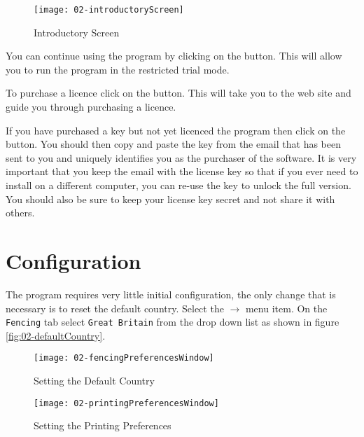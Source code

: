 \documentclass[a4paper,11pt]{memoir}
\begin{document}
\begin{figure}[!ht]
 \centering
 \texttt{[image: 02-introductoryScreen]}
 \caption{Introductory Screen}\label{fig:02-introductoryScreen}
\end{figure}

You can continue using the program by clicking on the  button. This will allow you to run the program in the restricted trial mode.

To purchase a licence click on the  button. This will take you to the \fencingtime{} web site and guide you through purchasing a licence.

If you have purchased a key but not yet licenced the program then click on the  button. You should then copy and paste the key from the email that has been sent to you and uniquely identifies you as the purchaser of the software. It is very important that you keep the email with the license key so that if you ever need to install \fencingtime{} on a different computer, you can re-use the key to unlock the full version. You should also be sure to keep your license key secret and not share it with others.

\section{Configuration}
The program requires very little initial configuration, the only change that is necessary is to reset the default country. Select the   $\rightarrow$  menu item. On the \texttt{Fencing} tab select \texttt{Great Britain} from the drop down list as shown in figure \ref{fig:02-defaultCountry}.

\begin{figure}[!ht]
  \centering
  \begin{minipage}{0.4\textwidth}
    \centering
    \texttt{[image: 02-fencingPreferencesWindow]}
    \caption{Setting the Default Country}\label{fig:02-defaultCountry}
  \end{minipage}
  \hfill
  \begin{minipage}{0.4\textwidth}
    \centering
    \texttt{[image: 02-printingPreferencesWindow]}
    \caption{Setting the Printing Preferences} \label{fig:02-printingPreferences}
  \end{minipage}
\end{figure}
\end{document}
